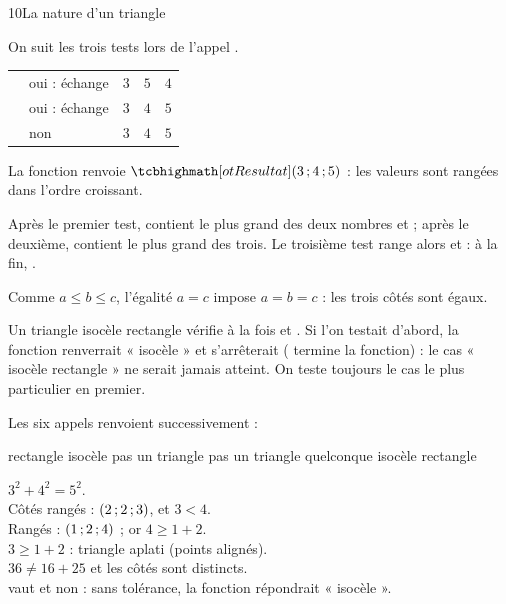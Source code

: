 \begin{corrige}{10}{La nature d'un triangle}
\begin{questions}
  \item On suit les trois tests lors de l'appel .
\begin{codecote}[0.5]
{\renewcommand{\arraystretch}{1.3}%
\begin{tabularx}{\linewidth}{@{}lYccc@{}}
\toprule
{} &  &  &  &  \\
\midrule
{} & oui : échange & $3$ & $5$ & $4$ \\
 & oui : échange & $3$ & $4$ & $5$ \\
 & non & $3$ & $4$ & $5$ \\
\bottomrule
\end{tabularx}}
\cote
La fonction renvoie $\res{(3\pv4\pv5)}$ : les valeurs sont rangées dans l'ordre croissant.
\end{codecote}
  \item Après le premier test,  contient le plus grand des deux nombres  et  ; après le deuxième, 
    contient le plus grand des trois. Le troisième test range alors  et  : à la fin, .
\end{questions}
\begin{questions}[start=3]
  \item Comme $a\leq b\leq c$, l'égalité $a=c$ impose $a=b=c$ : les trois côtés sont égaux.
  \item Un triangle isocèle rectangle vérifie à la fois  et . Si l'on testait  d'abord, la
    fonction renverrait « isocèle » et s'arrêterait ( termine la fonction) : le cas « isocèle rectangle » ne serait
    jamais atteint. On teste toujours le cas le plus particulier en premier.
  \item Les six appels renvoient successivement :
\begin{codecote}[0.4]
\begin{consolecol}
rectangle
isocèle
pas un triangle
pas un triangle
quelconque
isocèle rectangle
\end{consolecol}
\cote
{} $3^{2}+4^{2}=5^{2}$.\\[0.6mm]
 Côtés rangés : $(2\,{;}\,2\,{;}\,3)$, et $3<4$.\\[0.6mm]
 Rangés : $(1\,{;}\,2\,{;}\,4)$ ; or $4\geq1+2$.\\[0.6mm]
 $3\geq1+2$ : triangle aplati (points alignés).\\[0.6mm]
 $36\neq16+25$ et les côtés sont distincts.\\[0.6mm]
  vaut  et non  : sans tolérance, la fonction répondrait « isocèle ».
\end{codecote}
\end{questions}
\end{corrige}
